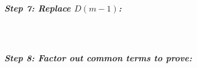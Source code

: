 \documentclass[a4paper,12pt]{book}
\newcounter{question}
\begin{document}
\begin{questionNOGRADE}{\thequestion}
            \subparagraph{Step 7: Replace $D(m-1)$:}~\\

            \subparagraph{Step 8: Factor out common terms to prove:}~\\
            
        \end{questionNOGRADE}

        \newpage
        
\end{document}
